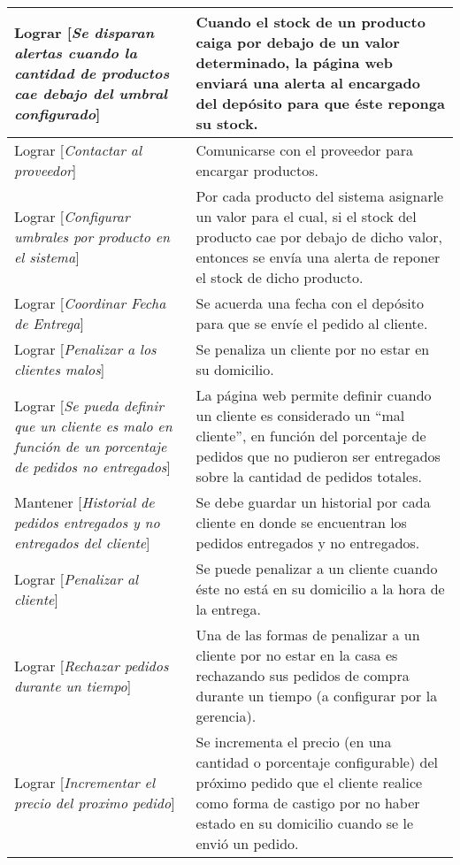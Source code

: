 \begin{center}
\begin{longtable}{p{7cm} p{7cm}}
Lograr [\textit{Se disparan alertas cuando la cantidad de productos cae debajo del umbral configurado}] & Cuando el stock de un producto caiga por debajo de un valor determinado, la página web enviará una alerta al encargado del depósito para que éste reponga su stock. \\[0.2em] \hline

Lograr [\textit{Contactar al proveedor}] & Comunicarse con el proveedor para encargar productos. \\[0.2em] \hline

Lograr [\textit{Configurar umbrales por producto en el sistema}] & Por cada producto del sistema asignarle un valor para el cual, si el stock del producto cae por debajo de dicho valor, entonces se envía una alerta de reponer el stock de dicho producto. \\[0.2em] \hline

Lograr [\textit{Coordinar Fecha de  Entrega}] & Se acuerda una fecha con el depósito para que se envíe el pedido al cliente. \\[0.2em] \hline

Lograr [\textit{Penalizar a los clientes malos}] & Se penaliza un cliente por no estar en su domicilio. \\[0.2em] \hline

Lograr [\textit{Se pueda definir que un cliente es malo en función de un porcentaje de pedidos no entregados}] & La página web permite definir cuando un cliente es considerado un “mal cliente”, en función del porcentaje de pedidos que no pudieron ser entregados sobre la cantidad de pedidos totales. \\[0.2em] \hline

Mantener [\textit{Historial de pedidos entregados y no entregados del cliente}] & Se debe guardar un historial por cada cliente en donde se encuentran los pedidos entregados y no entregados. \\[0.2em] \hline

Lograr [\textit{Penalizar al cliente}] & Se puede penalizar a un cliente cuando éste no está en su domicilio a la hora de la entrega. \\[0.2em] \hline

Lograr [\textit{Rechazar pedidos durante un tiempo}] & Una de las formas de penalizar a un cliente por no estar en la casa es rechazando sus pedidos de compra durante un tiempo (a configurar por la gerencia). \\[0.2em] \hline

Lograr [\textit{Incrementar el precio del proximo pedido}] & Se incrementa el precio (en una cantidad o porcentaje configurable) del próximo pedido que el cliente realice como forma de castigo por no haber estado en su domicilio cuando se le envió un pedido. \\[0.2em] \hline


\end{longtable}
\end{center}
